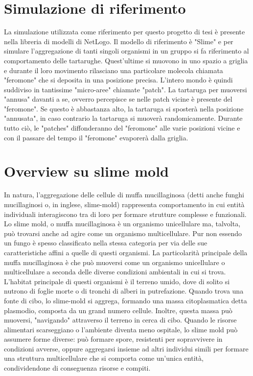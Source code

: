 \documentclass[12pt,a4paper,openright,twoside]{book}
\begin{document}
\section{Simulazione di riferimento} \label{refSim}
La simulazione utilizzata come riferimento per questo progetto di tesi è presente nella libreria
di modelli di NetLogo\cite{wilensky1997netlogo}. Il modello di riferimento è "Slime"\cite{wilensky1997netlogo}
e per simulare l'aggregazione di tanti singoli organismi in un gruppo si fa riferimento al comportamento delle tartarughe.
Quest'ultime si muovono in uno spazio a griglia e durante il loro movimento rilasciano una particolare molecola
chiamata "feromone" che si deposita in una posizione precisa. L'intero mondo è quindi suddiviso
in tantissime "micro-aree" chiamate "patch". La tartaruga per muoversi 
"annusa" davanti a se, ovverro percepisce se nelle patch vicine è presente del "feromone". Se questo è abbastanza alto, la 
tartaruga si sposterà nella posizione "annusata", in caso contrario la tartaruga si muoverà randomicamente. 
Durante tutto ciò, le "patches" diffonderanno del "feromone" alle varie posizioni vicine e con il passare del tempo 
il "feromone" evaporerà dalla griglia.

\section{Overview su slime mold}
In natura, l'aggregazione delle cellule di muffa mucillaginosa (detti anche funghi mucillaginosi o, in inglese, slime-mold) rappresenta
comportamento in cui entità individuali interagiscono tra di loro per formare strutture complesse e funzionali. 
Lo slime mold, o muffa mucillaginosa è un organismo unicellulare ma, talvolta, può trovarsi anche ad agire come un organismo multicellulare. 
Pur non essendo un fungo è spesso classificato nella stessa categoria per via delle sue caratteristiche affini a quelle di questi organismi.
La particolarità principale della muffa mucillaginosa è che può muoversi come un organismo unicellulare o multicellulare a seconda delle diverse 
condizioni ambientali in cui si trova.
L'habitat principale di questi organismi è il terreno umido, dove di solito si nutrono di foglie morte o di tronchi di alberi in putrefazione.
Quando trova una fonte di cibo, lo slime-mold si aggrega, formando una massa citoplasmatica detta plasmodio, composta da un grand numero cellule. Inoltre,
questa massa può muoversi, "navigando" attraverso il terreno in cerca di cibo.
Quando le risorse alimentari scarseggiano o l'ambiente diventa meno ospitale, lo slime mold può assumere forme diverse: può formare spore, 
resistenti per sopravvivere in condizioni avverse, oppure aggregarsi insieme ad altri individui simili per formare una struttura multicellulare
che si comporta come un'unica entità, condividendone di conseguenza risorse e compiti.
\end{document}
